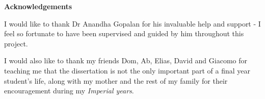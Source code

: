 \vspace*{2.5cm}
    \LARGE
    \textbf{Acknowledgements}

\normalsize
 \vspace{3cm}

I would like to thank Dr Anandha Gopalan for his invaluable help and support - I feel so fortunate to have been supervised and guided by him throughout this project.

\vspace{0.5cm}
I would also like to thank my friends Dom, Ab, Elias, David and Giacomo for teaching me that the dissertation is not the only important part of a final year student's life, along with my mother and the rest of my family for their encouragement during my \textit{Imperial years}.